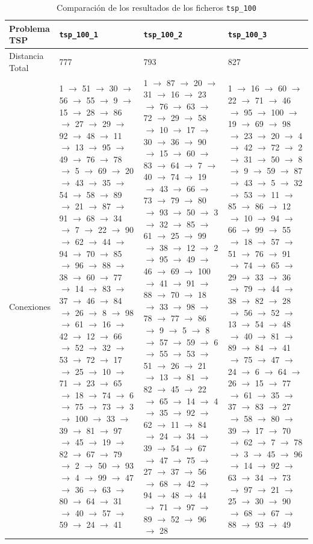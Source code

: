 \documentclass[a4paper,11pt]{article}
\begin{document}
\begin{table}[!htbp]
\label{results_tsp_100}
\centering
\begin{tabularx}{\textwidth}{|p{2cm}|X|X|X|}
\hline
Problema TSP    & \texttt{tsp\_100\_1}  & \texttt{tsp\_100\_2}  & \texttt{tsp\_100\_3}  \\ \hline
Distancia Total & 777    & 793   & 827   \\ \hline
Conexiones	& 1 $\to$ 51 $\to$ 30 $\to$ 56 $\to$ 55 $\to$ 9 $\to$ 15 $\to$ 28 $\to$ 86 $\to$ 27 $\to$ 29 $\to$ 92 $\to$ 48 $\to$ 11 $\to$ 13 $\to$ 95 $\to$ 49 $\to$ 76 $\to$ 78 $\to$ 5 $\to$ 69 $\to$ 20 $\to$ 43 $\to$ 35 $\to$ 54 $\to$ 58 $\to$ 89 $\to$ 21 $\to$ 87 $\to$ 91 $\to$ 68 $\to$ 34 $\to$ 7 $\to$ 22 $\to$ 90 $\to$ 62 $\to$ 44 $\to$ 94 $\to$ 70 $\to$ 85 $\to$ 96 $\to$ 88 $\to$ 38 $\to$ 60 $\to$ 77 $\to$ 14 $\to$ 83 $\to$ 37 $\to$ 46 $\to$ 84 $\to$ 26 $\to$ 8 $\to$ 98 $\to$ 61 $\to$ 16 $\to$ 42 $\to$ 12 $\to$ 66 $\to$ 52 $\to$ 32 $\to$ 53 $\to$ 72 $\to$ 17 $\to$ 25 $\to$ 10 $\to$ 71 $\to$ 23 $\to$ 65 $\to$ 18 $\to$ 74 $\to$ 6 $\to$ 75 $\to$ 73 $\to$ 3 $\to$ 100 $\to$ 33 $\to$ 39 $\to$ 81 $\to$ 97 $\to$ 45 $\to$ 19 $\to$ 82 $\to$ 67 $\to$ 79 $\to$ 2 $\to$ 50 $\to$ 93 $\to$ 4 $\to$ 99 $\to$ 47 $\to$ 36 $\to$ 63 $\to$ 80 $\to$ 64 $\to$ 31 $\to$ 40 $\to$ 57 $\to$ 59 $\to$ 24 $\to$ 41	& 1 $\to$ 87 $\to$ 20 $\to$ 31 $\to$ 16 $\to$ 23 $\to$ 76 $\to$ 63 $\to$ 72 $\to$ 29 $\to$ 58 $\to$ 10 $\to$ 17 $\to$ 30 $\to$ 36 $\to$ 90 $\to$ 15 $\to$ 60 $\to$ 83 $\to$ 64 $\to$ 7 $\to$ 40 $\to$ 74 $\to$ 19 $\to$ 43 $\to$ 66 $\to$ 73 $\to$ 79 $\to$ 80 $\to$ 93 $\to$ 50 $\to$ 3 $\to$ 32 $\to$ 85 $\to$ 61 $\to$ 25 $\to$ 99 $\to$ 38 $\to$ 12 $\to$ 2 $\to$ 95 $\to$ 49 $\to$ 46 $\to$ 69 $\to$ 100 $\to$ 41 $\to$ 91 $\to$ 88 $\to$ 70 $\to$ 18 $\to$ 33 $\to$ 98 $\to$ 78 $\to$ 77 $\to$ 86 $\to$ 9 $\to$ 5 $\to$ 8 $\to$ 57 $\to$ 59 $\to$ 6 $\to$ 55 $\to$ 53 $\to$ 51 $\to$ 26 $\to$ 21 $\to$ 13 $\to$ 81 $\to$ 82 $\to$ 45 $\to$ 22 $\to$ 65 $\to$ 14 $\to$ 4 $\to$ 35 $\to$ 92 $\to$ 62 $\to$ 11 $\to$ 84 $\to$ 24 $\to$ 34 $\to$ 39 $\to$ 54 $\to$ 67 $\to$ 47 $\to$ 75 $\to$ 27 $\to$ 37 $\to$ 56 $\to$ 68 $\to$ 42 $\to$ 94 $\to$ 48 $\to$ 44 $\to$ 71 $\to$ 97 $\to$ 89 $\to$ 52 $\to$ 96 $\to$ 28	& 1 $\to$ 16 $\to$ 60 $\to$ 22 $\to$ 71 $\to$ 46 $\to$ 95 $\to$ 100 $\to$ 19 $\to$ 69 $\to$ 98 $\to$ 23 $\to$ 20 $\to$ 4 $\to$ 42 $\to$ 72 $\to$ 2 $\to$ 31 $\to$ 50 $\to$ 8 $\to$ 9 $\to$ 59 $\to$ 87 $\to$ 43 $\to$ 5 $\to$ 32 $\to$ 53 $\to$ 11 $\to$ 85 $\to$ 86 $\to$ 12 $\to$ 10 $\to$ 94 $\to$ 66 $\to$ 99 $\to$ 55 $\to$ 18 $\to$ 57 $\to$ 51 $\to$ 76 $\to$ 91 $\to$ 74 $\to$ 65 $\to$ 29 $\to$ 33 $\to$ 36 $\to$ 79 $\to$ 44 $\to$ 38 $\to$ 82 $\to$ 28 $\to$ 56 $\to$ 52 $\to$ 13 $\to$ 54 $\to$ 48 $\to$ 40 $\to$ 81 $\to$ 89 $\to$ 84 $\to$ 41 $\to$ 75 $\to$ 47 $\to$ 24 $\to$ 6 $\to$ 64 $\to$ 26 $\to$ 15 $\to$ 77 $\to$ 61 $\to$ 35 $\to$ 37 $\to$ 83 $\to$ 27 $\to$ 58 $\to$ 80 $\to$ 39 $\to$ 17 $\to$ 70 $\to$ 62 $\to$ 7 $\to$ 78 $\to$ 3 $\to$ 45 $\to$ 96 $\to$ 14 $\to$ 92 $\to$ 63 $\to$ 34 $\to$ 73 $\to$ 97 $\to$ 21 $\to$ 25 $\to$ 30 $\to$ 90 $\to$ 68 $\to$ 67 $\to$ 88 $\to$ 93 $\to$ 49	\\ \hline
\end{tabularx}
\caption{Comparación de los resultados de los ficheros \texttt{tsp\_100}}
\end{table}
\end{document}
